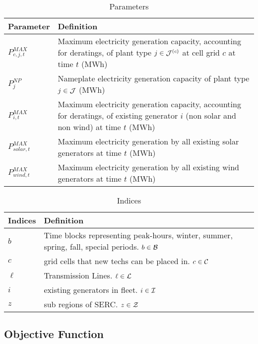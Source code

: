 \documentclass[11pt, oneside]{article}   	%
\begin{document}
\begin{table}[H]
   \centering
   \caption{Parameters}
   \begin{tabular}{p{1in} p{4in} } %
      \toprule
      \textbf{Parameter} & \textbf{Definition} \\
      \midrule
      $P^{MAX}_{c, j, t}$ & Maximum electricity generation capacity, accounting for deratings, of plant type $j \in \mathcal{J}^{(c)}$ at cell grid $c$ at time $t$ (MWh) \\
      $P^{NP}_{j}$ & Nameplate electricity generation capacity of plant type $j \in \mathcal{J}$ (MWh)\\
      $P^{MAX}_{i, t}$ & Maximum electricity generation capacity, accounting for deratings, of existing generator $i$ (non solar and non wind) at time $t$ (MWh)\\
      $P^{MAX}_{solar, t}$ & Maximum electricity generation by all existing solar generators at time $t$ (MWh) \\
      $P^{MAX}_{wind, t}$ & Maximum electricity generation by all existing wind generators at time $t$ (MWh) \\      
      \bottomrule
   \end{tabular}
   \label{tab:indices}
\end{table}


\begin{table}[H]
   \centering
   \caption{Indices}
   \begin{tabular}{p{1in} p{4in} } %
      \toprule
      \textbf{Indices} & \textbf{Definition} \\
      \midrule
      $b$ & Time blocks representing peak-hours, winter, summer, spring, fall, special periods. $b \in \mathcal{B}$\\
      $c$ & grid cells that new techs can be placed in. $c \in \mathcal{C}$ \\
      $\ell$ & Transmission Lines. $\ell \in \mathcal{L}$\\
      $i$ & existing generators in fleet. $i \in \mathcal{I}$\\
      $z$ & sub regions of SERC. $z \in \mathcal{Z}$\\
      \bottomrule
   \end{tabular}
   \label{tab:indices}
\end{table}

\subsection{Objective Function}
\end{document}
